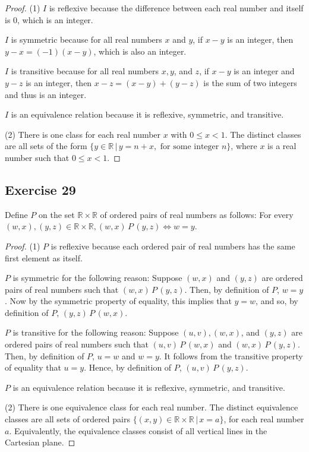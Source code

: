\documentclass[14pt]{extarticle}
\newcommand{\R}{\mathbb{R}}
\begin{document}
\begin{proof}
        (1) $I$ is reflexive because the difference between each real number and itself is 0, which is an integer.

        $I$ is symmetric because for all real numbers $x$ and $y$, if \(x - y\) is an integer, then \(y - x = (-1)(x - y)\),
        which is also an integer.

        $I$ is transitive because for all real numbers \(x, y\), and \(z\), if \(x - y\) is an integer and \(y - z\) is an
        integer, then \(x - z = (x - y) + (y - z)\) is the sum of two integers and thus is an integer.

        $I$ is an equivalence relation because it is reflexive, symmetric, and transitive.

        (2) There is one class for each real number $x$ with \(0 \leq x < 1\). The distinct classes are all sets of the form
        \(\{y \in \R \,|\, y = n + x, \text{ for some integer } n\}\), where $x$ is a real number such that \(0 \leq x < 1\).
\end{proof}

\subsection{Exercise 29}
Define $P$ on the set \(\R \times \R\) of ordered pairs of real numbers as follows: For every \((w, x), (y, z) \in \R
\times \R, (w, x) \,P\, (y, z) \iff w = y\).

\begin{proof}
        (1) $P$ is reflexive because each ordered pair of real numbers has the same first element as itself.

        $P$ is symmetric for the following reason: Suppose \((w, x)\) and \((y, z)\) are ordered pairs of real numbers such
        that \((w, x) \,P\, (y, z)\). Then, by definition of $P$, \(w = y\). Now by the symmetric property of equality, this
        implies that \(y = w\), and so, by definition of $P$, \((y, z) \,P\, (w, x)\).

        $P$ is transitive for the following reason: Suppose \((u, v), (w, x)\), and \((y, z)\) are ordered pairs of real
        numbers such that \((u, v) \,P\, (w, x)\) and \((w, x) \,P\, (y, z)\). Then, by definition of $P$, \(u = w\) and
        \(w = y\). It follows from the transitive property of equality that \(u = y\). Hence, by definition of $P$, \((u, v) \,P\, (y, z)\).

        $P$ is an equivalence relation because it is reflexive, symmetric, and transitive.

        (2) There is one equivalence class for each real number. The distinct equivalence classes are all sets of ordered
        pairs \(\{(x, y) \in \R \times \R \,|\, x = a\}\), for each real number $a$. Equivalently, the equivalence classes
        consist of all vertical lines in the Cartesian plane.
\end{proof}
\end{document}
